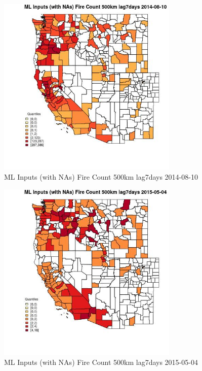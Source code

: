 \begin{figure} 
\centering  
\includegraphics[width=0.77\textwidth]{Code_Outputs/Report_ML_input_PM25_Step4_part_e_de_duplicated_aves_compiled_2019-05-18wNAs_CountyFire_Count_500km_lag7daysMean2014-08-10_2014-08-10.jpg} 
\caption{\label{fig:Report_ML_input_PM25_Step4_part_e_de_duplicated_aves_compiled_2019-05-18wNAsCountyFire_Count_500km_lag7daysMean2014-08-10_2014-08-10}ML Inputs (with NAs) Fire Count 500km lag7days 2014-08-10} 
\end{figure} 
 

\begin{figure} 
\centering  
\includegraphics[width=0.77\textwidth]{Code_Outputs/Report_ML_input_PM25_Step4_part_e_de_duplicated_aves_compiled_2019-05-18wNAs_CountyFire_Count_500km_lag7daysMean2015-05-04_2015-05-04.jpg} 
\caption{\label{fig:Report_ML_input_PM25_Step4_part_e_de_duplicated_aves_compiled_2019-05-18wNAsCountyFire_Count_500km_lag7daysMean2015-05-04_2015-05-04}ML Inputs (with NAs) Fire Count 500km lag7days 2015-05-04} 
\end{figure} 
 

